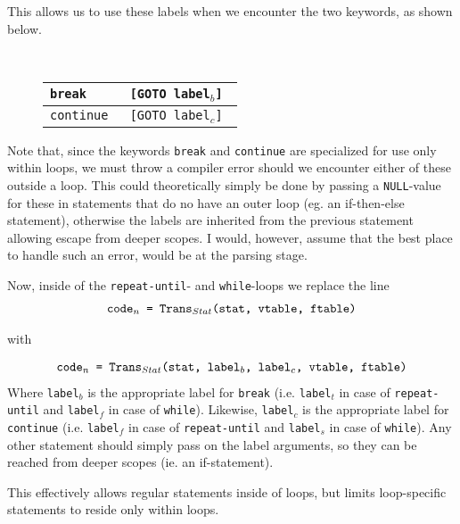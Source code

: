 \documentclass[11pt,a4paper]{article}
\begin{document}
This allows us to use these labels when we encounter the two keywords, as
shown below.
\begin{figure}[H]
	
	 \\
	\begin{tabular}{ll}
		\hline
		\tt break & \tt [GOTO label$_b$] \\ \hline
		\tt continue & \tt [GOTO label$_c$] \\ \hline
	\end{tabular}

\end{figure}
Note that, since the keywords {\tt break} and {\tt continue} are specialized
for use only within loops, we must throw a compiler error should we encounter
either of these outside a loop. This could theoretically simply be done by
passing a {\tt NULL}-value for these in statements that do no have an outer
loop (eg. an if-then-else statement), otherwise the labels are inherited from
the previous statement allowing escape from deeper scopes. I would, however,
assume that the best place to handle such an error, would be at the parsing
stage.

Now, inside of the {\tt repeat-until}- and {\tt while}-loops we replace the
line
\begin{align*}
	\text{\tt code$_n$ = Trans$_{Stat}$(stat, vtable, ftable)}
\end{align*}
\begin{center}with\end{center} \vspace{-0.12in}
\begin{align*}
	\text{\tt code$_n$ = Trans$_{Stat}$(stat, label$_b$, label$_c$, vtable, ftable)}
\end{align*}
Where {\tt label$_b$} is the appropriate label for {\tt break} (i.e.
{\tt label$_t$} in case of {\tt repeat-until} and {\tt label$_f$} in case of
{\tt while}). Likewise, {\tt label$_c$} is the appropriate label for
{\tt continue} (i.e. {\tt label$_f$} in case of {\tt repeat-until} and
{\tt label$_s$} in case of {\tt while}). Any other statement should simply
pass on the label arguments, so they can be reached from deeper scopes (ie. an
if-statement). 

This effectively allows regular statements inside of loops, but limits
loop-specific statements to reside only within loops.
\end{document}
